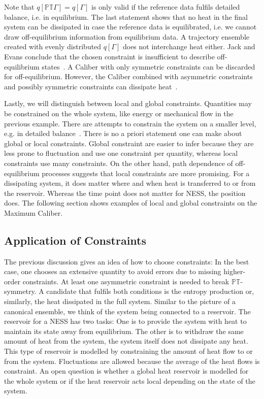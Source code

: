 Note that $q[\mathbb{PT} \Gamma]= q[\Gamma]$ is only valid if the reference data fulfils detailed balance, i.e. in equilibrium. The last statement shows that no heat in the final system can be dissipated in case the reference data is equilibrated, 
i.e. we cannot draw off-equilibrium information from equilibrium data. A trajectory ensemble created with evenly distributed $q[\Gamma]$ does not interchange heat either. Jack and Evans conclude that the chosen constraint is insufficient to describe off-equilibrium states~\cite{jack2016absence}. A Caliber with only symmetric constraints can be discarded for off-equilibrium. However,  the Caliber combined with asymmetric constraints and possibly symmetric constraints can dissipate heat~\cite{agozzino2019minimal}.

Lastly, we will distinguish between local and global constraints. Quantities may be constrained on the whole system, like energy or mechanical flow in the previous example. There are attempts to constrain the system on a smaller level, e.g. in detailed balance~\cite{wan2016maximum,rudzinski2016communication}. There is no a priori statement one can make about global or local constraints. Global constraint are easier to infer because they are less prone to fluctuation and use one constraint per quantity, whereas local constraints use many constraints. On the other hand, path dependence of off-equilibrium processes suggests that local constraints are more promising. For a dissipating system, it does matter where and when heat is transferred to or from the reservoir. Whereas the time point does not matter for NESS, the position does. The following section shows examples of local and global constraints on the Maximum Caliber.  

\subsection{Application of Constraints}
The previous discussion gives an idea of how to choose constraints: In the best case, one chooses an extensive quantity to avoid errors due to missing higher-order constraints. At least one asymmetric constraint is needed to break $\mathbb{PT}$-symmetry. A candidate that fulfils both conditions is the entropy production or, similarly, the heat dissipated in the full system. Similar to the picture of a canonical ensemble, we think of the system being connected to a reservoir. The reservoir for a NESS has two tasks: One is to provide the system with heat to maintain its state away from equilibrium. The other is to withdraw the same amount of heat from the system, the system itself does not dissipate any heat. This type of reservoir is modelled by constraining the amount of heat flow to or from the system. Fluctuations are allowed because the average of the heat flows is constraint. An open question is whether a global heat reservoir is modelled for the whole system or if the heat reservoir acts local depending on the state of the system.  

